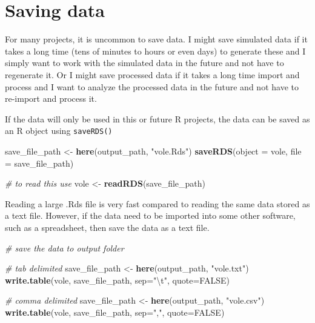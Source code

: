 \documentclass[]{book}
\newenvironment{Shaded}{\begin{snugshade}}{\end{snugshade}}
\newcommand{\KeywordTok}[1]{\textcolor[rgb]{0.13,0.29,0.53}{\textbf{#1}}}
\newcommand{\DataTypeTok}[1]{\textcolor[rgb]{0.13,0.29,0.53}{#1}}
\newcommand{\CharTok}[1]{\textcolor[rgb]{0.31,0.60,0.02}{#1}}
\newcommand{\StringTok}[1]{\textcolor[rgb]{0.31,0.60,0.02}{#1}}
\newcommand{\CommentTok}[1]{\textcolor[rgb]{0.56,0.35,0.01}{\textit{#1}}}
\newcommand{\OtherTok}[1]{\textcolor[rgb]{0.56,0.35,0.01}{#1}}
\newcommand{\NormalTok}[1]{#1}
\begin{document}
\section{Saving data}\label{saving-data}

For many projects, it is uncommon to save data. I might save simulated
data if it takes a long time (tens of minutes to hours or even days) to
generate these and I simply want to work with the simulated data in the
future and not have to regenerate it. Or I might save processed data if
it takes a long time import and process and I want to analyze the
processed data in the future and not have to re-import and process it.

If the data will only be used in this or future R projects, the data can
be saved as an R object using \texttt{saveRDS()}

\begin{Shaded}
\begin{Highlighting}[]
\NormalTok{save_file_path <-}\StringTok{ }\KeywordTok{here}\NormalTok{(output_path, }\StringTok{"vole.Rds"}\NormalTok{)}
\KeywordTok{saveRDS}\NormalTok{(}\DataTypeTok{object =}\NormalTok{ vole, }\DataTypeTok{file =}\NormalTok{ save_file_path)}

\CommentTok{# to read this use}
\NormalTok{vole <-}\StringTok{ }\KeywordTok{readRDS}\NormalTok{(save_file_path)}
\end{Highlighting}
\end{Shaded}

Reading a large .Rds file is very fast compared to reading the same data
stored as a text file. However, if the data need to be imported into
some other software, such as a spreadsheet, then save the data as a text
file.

\begin{Shaded}
\begin{Highlighting}[]
\CommentTok{# save the data to output folder}

\CommentTok{# tab delimited}
\NormalTok{save_file_path <-}\StringTok{ }\KeywordTok{here}\NormalTok{(output_path, }\StringTok{"vole.txt"}\NormalTok{)}
\KeywordTok{write.table}\NormalTok{(vole, save_file_path, }\DataTypeTok{sep=}\StringTok{"}\CharTok{\textbackslash{}t}\StringTok{"}\NormalTok{, }\DataTypeTok{quote=}\OtherTok{FALSE}\NormalTok{)}

\CommentTok{# comma delimited}
\NormalTok{save_file_path <-}\StringTok{ }\KeywordTok{here}\NormalTok{(output_path, }\StringTok{"vole.csv"}\NormalTok{)}
\KeywordTok{write.table}\NormalTok{(vole, save_file_path, }\DataTypeTok{sep=}\StringTok{","}\NormalTok{, }\DataTypeTok{quote=}\OtherTok{FALSE}\NormalTok{)}
\end{Highlighting}
\end{Shaded}
\end{document}
